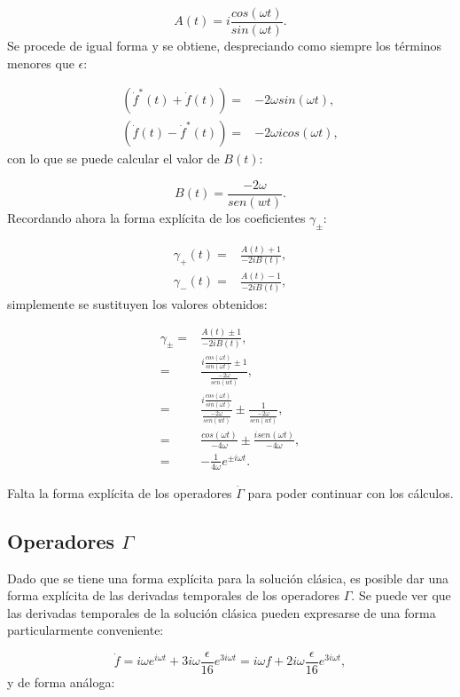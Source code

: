 \documentclass[a4paper,10pt]{report}
\begin{document}
\begin{equation}
A(t) = i \frac{cos(\omega t)}{sin(\omega t)}.
\end{equation} Se procede de igual forma y se obtiene, despreciando como siempre los términos menores que $\epsilon$:

\begin{align*}
(\dot{f}^* (t) + \dot{f}(t))=&-2\omega sin(\omega t),\\
(\dot{f} (t) - \dot{f}^*(t))=&-2\omega i cos(\omega t),
\end{align*} con lo que se puede calcular el valor de $B(t)$:

\begin{equation}
B(t) = \frac{-2\omega }{sen(wt)}.
\end{equation} Recordando ahora la forma explícita de los coeficientes $\gamma_{\pm}$:

\begin{align*}
\gamma_+(t)=&\frac{A(t) +1}{-2iB(t)},\\
\gamma_-(t)=&\frac{A(t) -1}{-2iB(t)},
\end{align*} simplemente se sustituyen los valores obtenidos:

\begin{align}
\gamma_\pm =& \frac{A(t) \pm 1}{-2iB(t)},\\
=& \frac{i \frac{cos(\omega t)}{sin(\omega t)}\pm 1}{\frac{-2\omega }{sen(wt)}}, \\
=& \frac{i \frac{cos(\omega t)}{sin(\omega t)}}{\frac{-2\omega }{sen(wt)}} \pm \frac{1}{\frac{-2\omega }{sen(wt)}}, \\
=& \frac{cos(\omega t)}{-4\omega} \pm \frac{i sen(\omega t)}{-4\omega},\\
=& -\frac{1}{4\omega}e^{\pm i\omega t}.
\end{align}

Falta la forma explícita de los operadores $\dot{\Gamma}$ para poder continuar con los cálculos.

\subsection{Operadores $\Gamma$}

Dado que se tiene una forma explícita para la solución clásica, es posible dar una forma explícita de las derivadas temporales de los operadores $\Gamma$. Se puede ver que las derivadas temporales de la solución clásica pueden expresarse de una forma particularmente conveniente:

\begin{equation}
\dot{f} = i\omega e^{i \omega t} + 3i\omega\frac{\epsilon}{16} e^{3i\omega t}= i\omega f + 2i\omega \frac{\epsilon}{16} e^{3i\omega t},
\end{equation} y de forma análoga:
\end{document}

